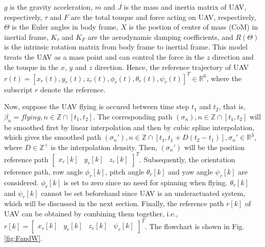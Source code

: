 \documentclass{ieeeaccess}
\begin{document}
$g$ is the gravity acceleration, $m$ and $J$ is the mass and inertia matrix of UAV, respectively, $\tau$ and $F$ are the total touque and force acting on UAV, respectively, $\Theta$ is the Euler angles in body frame, $X$ is the postion of center of mass (CoM) in inertial frame, $K_\tau$ and $K_F$ are the aerodynamic damping coefficients, and $R(\Theta)$ is the intrinsic rotation matrix from body frame to inertial frame. This model treats the UAV as a mass point and can control the force in the $z$ direction and the touque in the $x$, $y$ and $z$ direction. Hence, the reference trajectory of UAV $r(t)=[x_r(t),y_r(t),z_r(t),\phi_r(t),\theta_r(t),\psi_r(t)]^T\in\mathbb{R}^{6}$, where the subscript $r$ denote the reference.

Now, suppose the UAV flying is occured between time step $t_1$ and $t_2$, that is, $\beta_n=\mathit{flying}, n\in\mathbb{Z}\cap[t_1,t_2]$. The corresponding path $(\sigma_n), n\in\mathbb{Z}\cap[t_1,t_2]$ will be smoothed first by linear interpolation and then by cubic spline interpolation, which gives the smoothed path $(\sigma_n'), n\in\mathbb{Z}\cap[t_1,t_1+D(t_2-t_1)], \sigma_n'\in\mathbb{R}^3$, where $D\in\mathbb{Z}^+$ is the interpolation density. Then, $(\sigma_n')$ will be the position reference path $\begin{bmatrix}
    x_r[k] & y_r[k] & z_r[k]
\end{bmatrix}^T$. Subsequently, the orientation reference path, row angle $\phi_r[k]$, pitch angle $\theta_r[k]$ and yaw angle $\psi_r[k]$ are considered. $\phi_r[k]$ is set to zero since no need for spinning when flying. $\theta_r[k]$ and $\psi_r[k]$ cannot be set beforehand since UAV is an underactuated system, which will be discussed in the next section. Finally, the reference path $r[k]$ of UAV can be obtained by combining them together, i.e., $r[k] = \begin{bmatrix}
    x_r[k] & y_r[k] & z_r[k] & \psi_r[k]
\end{bmatrix}^T$. The flowchart is shown in Fig. \ref{fig:FandW}.


\end{document}

